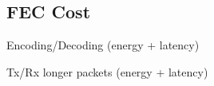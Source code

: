 \subsection{FEC Cost}

\begin{description}
	\item Encoding/Decoding (energy + latency)
	\item Tx/Rx longer packets (energy + latency)
\end{description}

